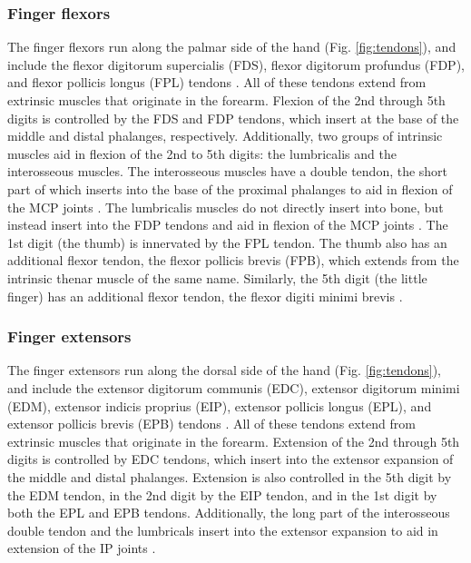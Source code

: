 \documentclass[12pt]{article}
\begin{document}
\subsubsection*{Finger flexors}
The finger flexors run along the palmar side of the hand (Fig. \ref{fig:tendons}), and include the flexor digitorum supercialis (FDS), flexor digitorum profundus (FDP), and flexor pollicis longus (FPL) tendons \citep{tortora2014principles,ombregt2013applied}. All of these tendons extend from extrinsic muscles that originate in the forearm. Flexion of the 2nd through 5th digits is controlled by the FDS and FDP tendons, which insert at the base of the middle and distal phalanges, respectively. Additionally, two groups of intrinsic muscles aid in flexion of the 2nd to 5th digits: the lumbricalis and the interosseous muscles. The interosseous muscles have a double tendon, the short part of which inserts into the base of the proximal phalanges to aid in flexion of the MCP joints \citep{videoAtlas}. The lumbricalis muscles do not directly insert into bone, but instead insert into the FDP tendons and aid in flexion of the MCP joints \citep{valenzuela2018lumbricals}. The 1st digit (the thumb) is innervated by the FPL tendon. The thumb also has an additional flexor tendon, the flexor pollicis brevis (FPB), which extends from the intrinsic thenar muscle of the same name. Similarly, the 5th digit (the little finger) has an additional flexor tendon, the flexor digiti minimi brevis \citep{tortora2014principles}.

\subsubsection*{Finger extensors}
The finger extensors run along the dorsal side of the hand (Fig. \ref{fig:tendons}), and include the extensor digitorum communis (EDC), extensor digitorum minimi (EDM), extensor indicis proprius (EIP), extensor pollicis longus (EPL), and extensor pollicis brevis (EPB) tendons \citep{tortora2014principles,ombregt2013applied}. All of these tendons extend from extrinsic muscles that originate in the forearm. Extension of the 2nd through 5th digits is controlled by EDC tendons, which insert into the extensor expansion of the middle and distal phalanges. Extension is also controlled in the 5th digit by the EDM tendon, in the 2nd digit by the EIP tendon, and in the 1st digit by both the EPL and EPB tendons. Additionally, the long part of the interosseous double tendon and the lumbricals insert into the extensor expansion to aid in extension of the IP joints \citep{videoAtlas,ombregt2013applied}.
\end{document}
